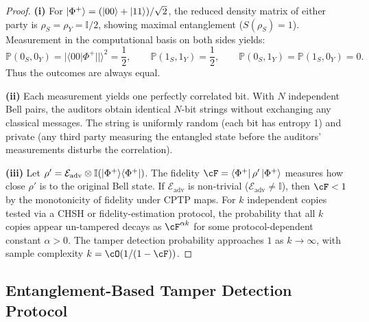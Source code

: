 \documentclass[11pt,a4paper]{article}
\theoremstyle{plain}
\theoremstyle{definition}
\theoremstyle{remark}
\newcommand{\Pbb}{\mathbb{P}}
\newcommand{\cE}{\mathcal{E}}
\newcommand{\id}{\mathbb{I}}
\newcommand{\ketbra}[2]{\ket{#1}\!\bra{#2}}
\newcommand{\braket}[2]{\langle #1 | #2 \rangle}
\newcommand{\bell}[0]{\ket{\Phi^{+}}}
\begin{document}
\begin{proof}
\textbf{(i)} For $\bell = (\ket{00} + \ket{11})/\sqrt{2}$, the reduced
density matrix of either party is $\rho_S = \rho_Y = \id/2$, showing maximal
entanglement ($S(\rho_S) = 1$). Measurement in the computational basis on
both sides yields:
\[
\Pbb(0_S, 0_Y) = |\braket{00|\Phi^+}|^2 = \frac{1}{2}, \qquad
\Pbb(1_S, 1_Y) = \frac{1}{2}, \qquad
\Pbb(0_S, 1_Y) = \Pbb(1_S, 0_Y) = 0.
\]
Thus the outcomes are always equal.

\textbf{(ii)} Each measurement yields one perfectly correlated bit. With $N$
independent Bell pairs, the auditors obtain identical $N$-bit strings without
exchanging any classical messages. The string is uniformly random (each bit
has entropy 1) and private (any third party measuring the entangled state
before the auditors' measurements disturbs the correlation).

\textbf{(iii)} Let $\rho' = \cE_{\text{adv}} \otimes \id(\ketbra{\Phi^+}{\Phi^+})$.
The fidelity $\cF = \bra{\Phi^+}\rho'\ket{\Phi^+}$ measures how close
$\rho'$ is to the original Bell state. If $\cE_{\text{adv}}$ is non-trivial
($\cE_{\text{adv}} \neq \id$), then $\cF < 1$ by the monotonicity of
fidelity under CPTP maps. For $k$ independent copies tested via a CHSH
or fidelity-estimation protocol, the probability that all $k$ copies
appear un-tampered decays as $\cF^{\alpha k}$ for some protocol-dependent
constant $\alpha > 0$. The tamper detection probability approaches
$1$ as $k \to \infty$, with sample complexity $k = \cO(1/(1-\cF))$.
\end{proof}

\subsection{Entanglement-Based Tamper Detection Protocol}
\label{sec:ent_tamper}
\end{document}
